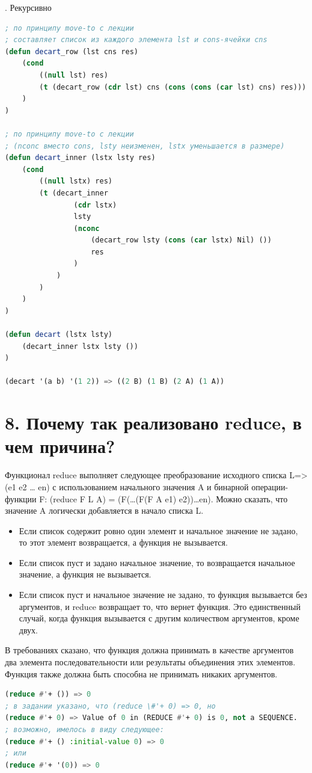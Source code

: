 \documentclass[12pt]{report}
\begin{document}
. Рекурсивно
\begin{lstlisting}[language=Lisp]
; по принципу move-to с лекции
; составляет список из каждого элемента lst и cons-ячейки cns
(defun decart_row (lst cns res) 
	(cond
		((null lst) res)
		(t (decart_row (cdr lst) cns (cons (cons (car lst) cns) res)))
	)
)

; по принципу move-to с лекции 
; (nconc вместо cons, lsty неизменен, lstx уменьшается в размере)
(defun decart_inner (lstx lsty res) 
	(cond
		((null lstx) res)
		(t (decart_inner 
				(cdr lstx) 
				lsty 
				(nconc 
					(decart_row lsty (cons (car lstx) Nil) ())
					res
				)
			)
		)
	)
)	

(defun decart (lstx lsty) 
	(decart_inner lstx lsty ())
)

(decart '(a b) '(1 2)) => ((2 B) (1 B) (2 A) (1 A))	
\end{lstlisting}


\section*{8. Почему так реализовано reduce, в чем причина?}

Функционал reduce выполняет следующее преобразование исходного списка L=>(e1 e2 … en) с использованием начального значения A и бинарной операции-функции F: (reduce F L A) = (F(…(F(F A e1) e2))…en). Можно сказать, что значение A логически добавляется в начало списка L.

\begin{itemize}
	\item Если список содержит ровно один элемент и начальное значение не задано, то этот элемент возвращается, а функция не вызывается. 
	\item Если список пуст и задано начальное значение, то возвращается начальное значение, а функция не вызывается. 
	\item Если список пуст и начальное значение не задано, то функция вызывается без аргументов, и reduce возвращает то, что вернет функция. Это единственный случай, когда функция вызывается с другим количеством аргументов, кроме двух.
\end{itemize}

В требованиях сказано, что функция должна принимать в качестве аргументов два элемента последовательности или результаты объединения этих элементов. Функция также должна быть способна не принимать никаких аргументов.

\begin{lstlisting}[language=Lisp]
(reduce #'+ ()) => 0
; в задании указано, что (reduce \#'+ 0) => 0, но
(reduce #'+ 0) => Value of 0 in (REDUCE #'+ 0) is 0, not a SEQUENCE.
; возможно, имелось в виду следующее:
(reduce #'+ () :initial-value 0) => 0
; или
(reduce #'+ '(0)) => 0
\end{lstlisting}
\end{document}
